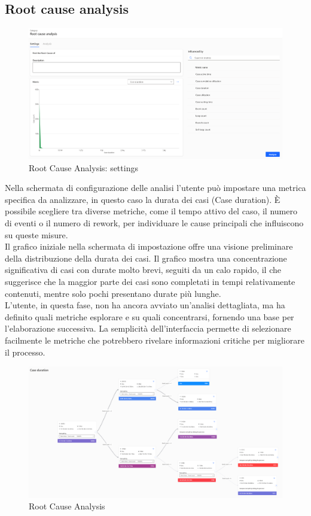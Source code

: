 \documentclass{article}
\begin{document}
\subsection{Root cause analysis}
\begin{figure}[H]
    \centering
    \includegraphics[width=\textwidth]{imgMicrosoft/DatiReali/RootCauseAnalysisSettingsDatiReali.png}
    \caption{Root Cause Analysis: settings}
    \label{fig:root-cause-analysis-settings}
\end{figure}
Nella schermata di configurazione delle analisi l'utente può impostare una metrica specifica da analizzare, in questo caso la durata dei casi (Case duration). È possibile scegliere tra diverse metriche, come il tempo attivo del caso, il numero di eventi o il numero di rework, per individuare le cause principali che influiscono su queste misure.\\
Il grafico iniziale nella schermata di impostazione offre una visione preliminare della distribuzione della durata dei casi. Il grafico mostra una concentrazione significativa di casi con durate molto brevi, seguiti da un calo rapido, il che suggerisce che la maggior parte dei casi sono completati in tempi relativamente contenuti, mentre solo pochi presentano durate più lunghe.\\
L'utente, in questa fase, non ha ancora avviato un'analisi dettagliata, ma ha definito quali metriche esplorare e su quali concentrarsi, fornendo una base per l'elaborazione successiva. La semplicità dell'interfaccia permette di selezionare facilmente le metriche che potrebbero rivelare informazioni critiche per migliorare il processo.
\begin{figure}[H]
    \centering
    \includegraphics[width=\textwidth]{imgMicrosoft/DatiReali/RootCauseAnalysisDatiReali.png}
    \caption{Root Cause Analysis}
    \label{fig:root-cause-analysis}
\end{figure}
\end{document}
